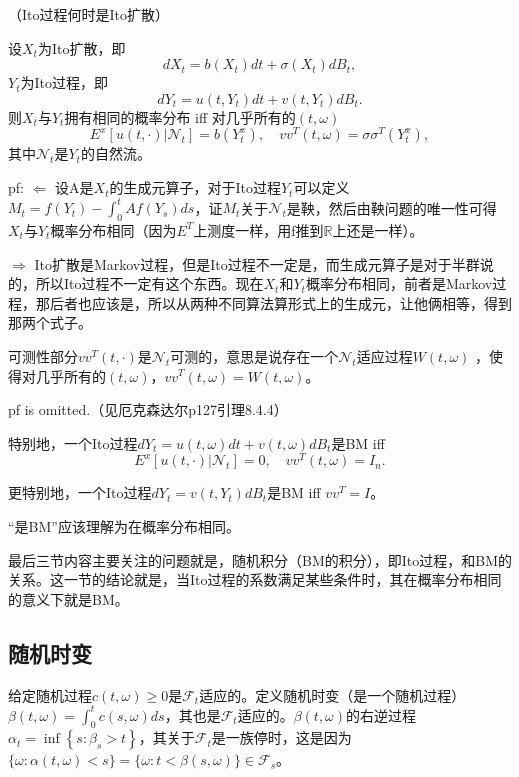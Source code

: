 \begin{thm}（Ito过程何时是Ito扩散）

  设$X_t$为Ito扩散，即
  \[
    dX_t = b(X_t)dt + \sigma(X_t)dB_t,
  \]
  $Y_t$为Ito过程，即
  \[
    dY_t = u(t, Y_t)dt + v(t, Y_t)dB_t.
  \]
  则$X_t$与$Y_t$拥有相同的概率分布 iff 对几乎所有的$(t, \omega)$
  \[
    E^{x}\left[u(t, \cdot) | \mathcal{N}_{t}\right]=b\left(Y_{t}^{x}\right), \quad v v^{T}(t, \omega)=\sigma \sigma^{T}\left(Y_{t}^{x}\right),
  \]
  其中$\mathcal{N}_{t}$是$Y_t$的自然流。
\end{thm}

pf: $\Leftarrow$ 设A是$X_t$的生成元算子，对于Ito过程$Y_t$可以定义$M_t = f(Y_t) - \int_0^t Af(Y_s) ds$，证$M_t$关于$\mathcal{N}_t$是鞅，然后由鞅问题的唯一性可得$X_t$与$Y_t$概率分布相同（因为$E^T$上测度一样，用f推到$\mathbb{R}$上还是一样）。

$\Rightarrow$ Ito扩散是Markov过程，但是Ito过程不一定是，而生成元算子是对于半群说的，所以Ito过程不一定有这个东西。现在$X_t$和$Y_t$概率分布相同，前者是Markov过程，那后者也应该是，所以从两种不同算法算形式上的生成元，让他俩相等，得到那两个式子。

可测性部分$v v^{T}(t, \cdot)$是$\mathcal{N}_{t}$可测的，意思是说存在一个$\mathcal{N}_{t}$适应过程$W(t, \omega)$ ，使得对几乎所有的$(t, \omega)$，$v v^{T}(t, \omega)=W(t, \omega)$。

pf is omitted.（见厄克森达尔p127引理8.4.4）

特别地，一个Ito过程$d Y_{t}=u(t, \omega) d t+v(t, \omega) d B_{t}$是BM iff 
\[
  E^{x}\left[u(t, \cdot) | \mathcal{N}_{t}\right]=0, \quad v v^{T}(t, \omega)=I_{n}.
\]

更特别地，一个Ito过程$d Y_t = v(t, Y_t)dB_t$是BM iff $vv^T = I$。

“是BM”应该理解为在概率分布相同。

最后三节内容主要关注的问题就是，随机积分（BM的积分），即Ito过程，和BM的关系。这一节的结论就是，当Ito过程的系数满足某些条件时，其在概率分布相同的意义下就是BM。

\subsection{随机时变}

给定随机过程$c(t, \omega) \ge 0$是$\mathcal{F}_t$适应的。定义随机时变（是一个随机过程）$\beta(t, \omega) = \int_0^t c(s, \omega) ds$，其也是$\mathcal{F}_t$适应的。$\beta(t, \omega)$的右逆过程$\alpha_{t}=\inf \left\{s: \beta_{s}>t\right\}$，其关于$\mathcal{F}_t$是一族停时，这是因为$\{\omega: \alpha(t, \omega)<s\}=\{\omega: t<\beta(s, \omega)\} \in \mathcal{F}_{s}$。

